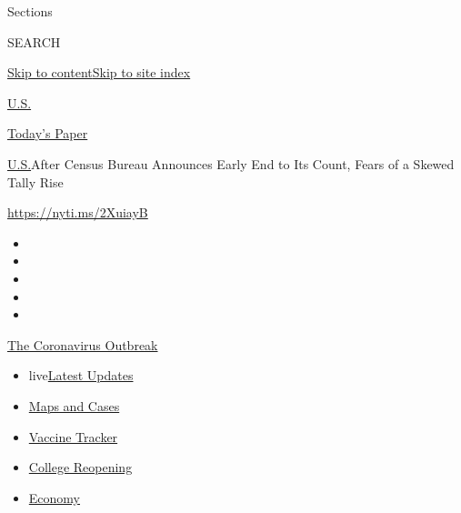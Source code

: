 Sections

SEARCH

\protect\hyperlink{site-content}{Skip to
content}\protect\hyperlink{site-index}{Skip to site index}

\href{https://www.nytimes.com/section/us}{U.S.}

\href{https://myaccount.nytimes.com/auth/login?response_type=cookie\&client_id=vi}{}

\href{https://www.nytimes.com/section/todayspaper}{Today's Paper}

\href{/section/us}{U.S.}\textbar{}After Census Bureau Announces Early
End to Its Count, Fears of a Skewed Tally Rise

\url{https://nyti.ms/2XuiayB}

\begin{itemize}
\item
\item
\item
\item
\item
\end{itemize}

\href{https://www.nytimes.com/news-event/coronavirus?action=click\&pgtype=Article\&state=default\&region=TOP_BANNER\&context=storylines_menu}{The
Coronavirus Outbreak}

\begin{itemize}
\tightlist
\item
  live\href{https://www.nytimes.com/2020/08/04/world/coronavirus-cases.html?action=click\&pgtype=Article\&state=default\&region=TOP_BANNER\&context=storylines_menu}{Latest
  Updates}
\item
  \href{https://www.nytimes.com/interactive/2020/us/coronavirus-us-cases.html?action=click\&pgtype=Article\&state=default\&region=TOP_BANNER\&context=storylines_menu}{Maps
  and Cases}
\item
  \href{https://www.nytimes.com/interactive/2020/science/coronavirus-vaccine-tracker.html?action=click\&pgtype=Article\&state=default\&region=TOP_BANNER\&context=storylines_menu}{Vaccine
  Tracker}
\item
  \href{https://www.nytimes.com/2020/08/02/us/covid-college-reopening.html?action=click\&pgtype=Article\&state=default\&region=TOP_BANNER\&context=storylines_menu}{College
  Reopening}
\item
  \href{https://www.nytimes.com/live/2020/08/04/business/stock-market-today-coronavirus?action=click\&pgtype=Article\&state=default\&region=TOP_BANNER\&context=storylines_menu}{Economy}
\end{itemize}

